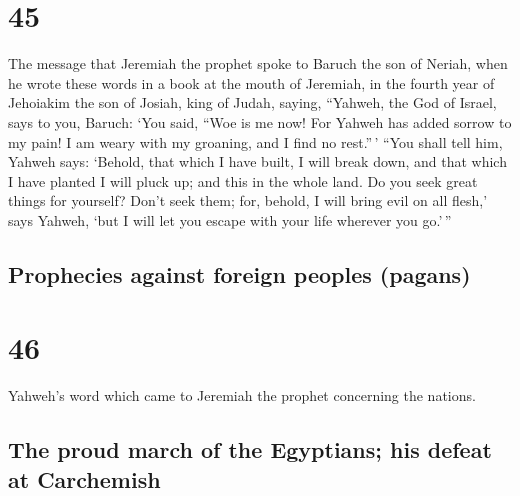 \hypertarget{section-44}{%
\section{45}\label{section-44}}

 The message that Jeremiah the prophet spoke to Baruch the
son of Neriah, when he wrote these words in a book at the mouth of
Jeremiah, in the fourth year of Jehoiakim the son of Josiah, king of
Judah, saying,  ``Yahweh, the God of Israel, says to you,
Baruch:  `You said, ``Woe is me now! For Yahweh has added
sorrow to my pain! I am weary with my groaning, and I find no rest.''\,'
 ``You shall tell him, Yahweh says: `Behold, that which I
have built, I will break down, and that which I have planted I will
pluck up; and this in the whole land.  Do you seek great
things for yourself? Don't seek them; for, behold, I will bring evil on
all flesh,' says Yahweh, `but I will let you escape with your life
wherever you go.'\,''

\hypertarget{prophecies-against-foreign-peoples-pagans}{%
\subsection{Prophecies against foreign peoples
(pagans)}\label{prophecies-against-foreign-peoples-pagans}}

\hypertarget{section-45}{%
\section{46}\label{section-45}}

 Yahweh's word which came to Jeremiah the prophet
concerning the nations.

\hypertarget{the-proud-march-of-the-egyptians-his-defeat-at-carchemish}{%
\subsection{The proud march of the Egyptians; his defeat at
Carchemish}\label{the-proud-march-of-the-egyptians-his-defeat-at-carchemish}}

